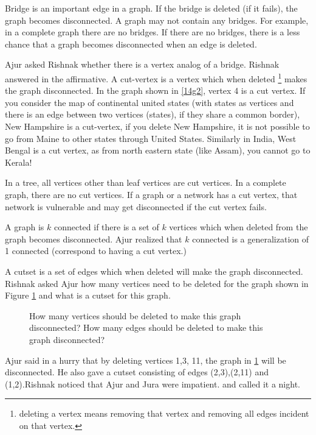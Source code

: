 Bridge is an important edge in a graph. If the bridge is deleted (if it fails), the graph becomes disconnected. A graph may not contain any bridges. For example, in a complete graph there are no
bridges. If there are no bridges, there is a less chance that a graph becomes disconnected when an edge is deleted.

Ajur asked Rishnak whether there is a vertex analog of a bridge. Rishnak answered in the affirmative. A cut-vertex is a vertex which when deleted \footnote{deleting a vertex means removing that vertex and removing all edges incident on that vertex.} makes the graph disconnected. In the graph shown in \ref{14g2}, vertex 4 is a cut vertex. If you consider the map of continental united states (with states as vertices and there is an edge between two vertices (states), if they share a common border), New Hampshire is a cut-vertex, if you delete New Hampshire, it is not possible to go from Maine to other states through United States. Similarly in India, West Bengal is  a cut vertex, as from north eastern state (like Assam), you cannot go to Kerala!

In a tree, all vertices other than leaf vertices are cut vertices. In a complete graph, there are no cut vertices. If a graph or a network has a cut vertex, that network is vulnerable and may get disconnected if the cut vertex fails. 

A graph is $k$ connected if there is a set of $k$ vertices which when deleted from the graph becomes disconnected. Ajur realized that $k$ connected is a generalization of 1 connected (correspond to having a cut vertex.)

A cutset is a set of edges which when deleted will make the graph disconnected. Rishnak asked Ajur how many vertices need to be deleted for the graph shown in Figure \ref{14g3} and what is a cutset for this graph.

\begin{figure}
\begin{center}

\caption{How many vertices should be deleted to make this graph disconnected? How many edges should be deleted to make this graph disconnected? }\label{14g3}
\end{center}
\end{figure}

Ajur said in a hurry that by deleting vertices 1,3, 11, the graph in \ref{14g3} will be disconnected. He
also gave a cutset consisting of edges (2,3),(2,11) and (1,2).Rishnak noticed that Ajur and Jura were impatient.  and called it a night.